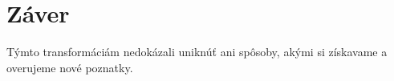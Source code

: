 \documentclass[10pt,slovak,a4paper]{article}%
\begin{document}
\section{Záver}


Týmto transformáciám nedokázali uniknúť ani spôsoby, akými si získavame a overujeme nové poznatky.





\end{document}
